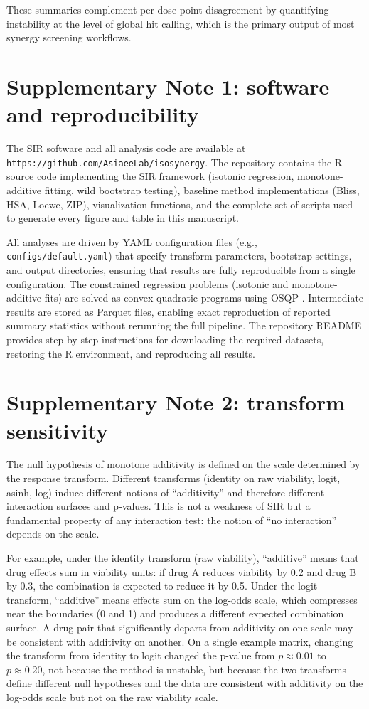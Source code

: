\documentclass[11pt]{article}
\begin{document}
These summaries complement per-dose-point disagreement by quantifying instability at the level of global hit calling, which is the primary output of most synergy screening workflows.

\section{Supplementary Note 1: software and reproducibility}

The SIR software and all analysis code are available at \texttt{https://github.com/AsiaeeLab/isosynergy}.
The repository contains the R source code implementing the SIR framework (isotonic regression, monotone-additive fitting, wild bootstrap testing), baseline method implementations (Bliss, HSA, Loewe, ZIP), visualization functions, and the complete set of scripts used to generate every figure and table in this manuscript.

All analyses are driven by YAML configuration files (e.g., \texttt{configs/default.yaml}) that specify transform parameters, bootstrap settings, and output directories, ensuring that results are fully reproducible from a single configuration.
The constrained regression problems (isotonic and monotone-additive fits) are solved as convex quadratic programs using OSQP \cite{Stellato2020}.
Intermediate results are stored as Parquet files, enabling exact reproduction of reported summary statistics without rerunning the full pipeline.
The repository README provides step-by-step instructions for downloading the required datasets, restoring the R environment, and reproducing all results.

\section{Supplementary Note 2: transform sensitivity}

The null hypothesis of monotone additivity is defined on the scale determined by the response transform.
Different transforms (identity on raw viability, logit, asinh, log) induce different notions of ``additivity'' and therefore different interaction surfaces and p-values.
This is not a weakness of SIR but a fundamental property of any interaction test: the notion of ``no interaction'' depends on the scale.

For example, under the identity transform (raw viability), ``additive'' means that drug effects sum in viability units: if drug A reduces viability by 0.2 and drug B by 0.3, the combination is expected to reduce it by 0.5.
Under the logit transform, ``additive'' means effects sum on the log-odds scale, which compresses near the boundaries (0 and 1) and produces a different expected combination surface.
A drug pair that significantly departs from additivity on one scale may be consistent with additivity on another.
On a single example matrix, changing the transform from identity to logit changed the p-value from $p\approx 0.01$ to $p\approx 0.20$, not because the method is unstable, but because the two transforms define different null hypotheses and the data are consistent with additivity on the log-odds scale but not on the raw viability scale.
\end{document}
